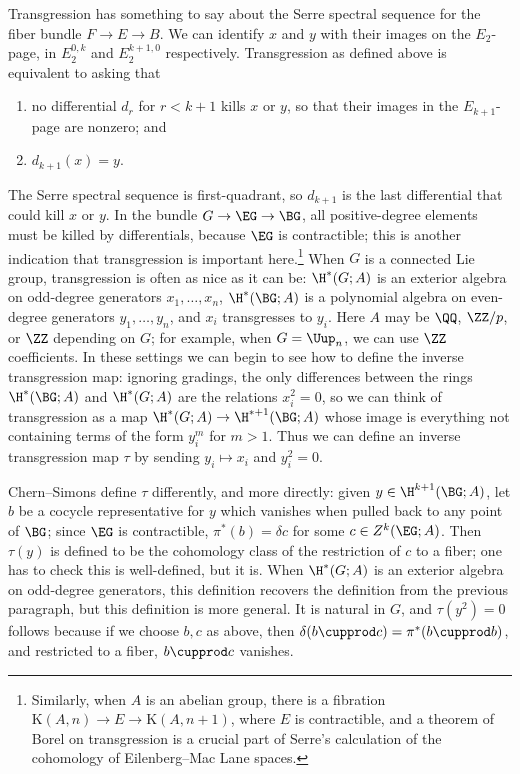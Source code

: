 \begin{remark}
Transgression has something to say about the Serre spectral sequence for the fiber bundle $F\to E\to B$. We can identify $x$ and $y$ with their images on the
$E_2$-page, in $E_2^{0,k}$ and $E_2^{k+1,0}$ respectively. Transgression as defined above is equivalent to asking
that
\begin{enumerate}[(1)]
	\item no differential $d_r$ for $r < k+1$ kills $x$ or $y$, so that their images in the $E_{k+1}$-page are
	nonzero; and
	\item $d_{k+1}(x) = y$.
\end{enumerate}
The Serre spectral sequence is first-quadrant, so $d_{k+1}$ is the last differential that could kill $x$ or $y$.
In the bundle $G\to \EG\to \BG$, all positive-degree elements must be killed by differentials, because $\EG$ is
contractible; this is another indication that transgression is important here.\footnote{Similarly, when $A$ is an
abelian group, there is a fibration $\mathrm K(A, n)\to E\to \mathrm K(A, n+1)$, where $E$ is contractible, and a
theorem of Borel \cite[Theorem 13.1]{Bor53} on transgression is a crucial part of Serre's calculation \cite{Ser53}
of the cohomology of Eilenberg--Mac Lane spaces.} When $G$ is a
connected Lie group, transgression is often as nice as it can be: $\H^*(G;A)$ is an exterior algebra on odd-degree
generators $x_1,\dotsc,x_n$, $\H^*(\BG;A)$ is a polynomial algebra on even-degree generators $y_1,\dotsc,y_n$, and
$x_i$ transgresses to $y_i$. Here $A$ may be $\QQ$, $\ZZ/p$, or $\ZZ$ depending on $G$; for example, when $G =
\Uup_n$, we can use $\ZZ$ coefficients. In these settings we can begin to see how to define the inverse
transgression map: ignoring gradings, the only differences between the rings $\H^*(\BG;A)$ and $\H^*(G;A)$ are the
relations $x_i^2 = 0$, so we can think of transgression as a map $\H^*(G;A)\to \H^{*+1}(\BG; A)$ whose image is
everything not containing terms of the form $y_i^m$ for $m > 1$. Thus we can define an inverse transgression
map $\tau$ by sending $y_i\mapsto x_i$ and $y_i^2 = 0$.

Chern--Simons \cite[\S 5]{cs} define $\tau$ differently, and more directly: given $y\in \H^{k+1}(\BG;A)$, let $b$ be
a cocycle representative for $y$ which vanishes when pulled back to any point of $\BG$; since $\EG$ is
contractible, $\pi^*(b) = \delta c$ for some $c\in Z^k(\EG; A)$. Then $\tau(y)$ is defined to be the cohomology
class of the restriction of $c$ to a fiber; one has to check this is well-defined, but it is. When $\H^*(G; A)$ is
an exterior algebra on odd-degree generators, this definition recovers the definition from the previous paragraph,
but this definition is more general. It is natural in $G$, and $\tau(y^2) = 0$ follows because if we choose $b,c$
as above, then $\delta(b\cupprod c) = \pi^*(b\cupprod b)$, and restricted to a fiber, $b\cupprod c$ vanishes.


\end{remark}
